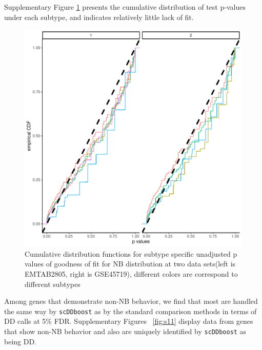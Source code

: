 \documentclass[aoas,preprint]{imsart}
\begin{document}
Supplementary Figure \ref{fig:nb} presents the cumulative distribution of test p-values under each subtype, and
indicates relatively little lack of fit.
\begin{figure}[h!]
  \includegraphics[width=\linewidth]{Figs/nbfit.pdf}
  \caption{Cumulative distribution functions for subtype specific unadjusted p values of goodness of fit for NB distribution at two data sets(left is EMTAB2805, right is GSE45719), different colors are correspond to different subtypes}
  \label{fig:nb}
\end{figure}
Among genes that demonstrate non-NB behavior, we find that most are handled the same way by \texttt{scDDboost}
as by the standard comparison methods in terms of DD calls at 5\% FDR.  
 Supplementary Figures ~\ref{fig:s11} display data from genes that show non-NB behavior
and also are uniquely identified by \texttt{scDDboost} as being DD.   
\end{document}
